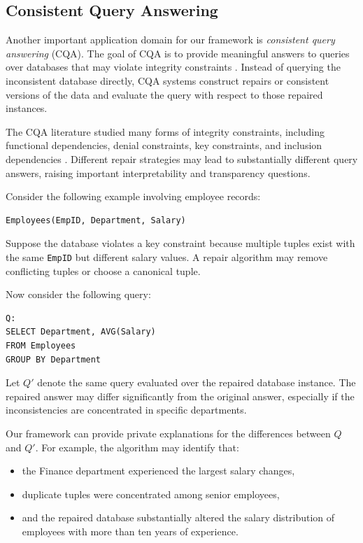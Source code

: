 \subsection{Consistent Query Answering}

Another important application domain for our framework is
\emph{consistent query answering} (CQA).
The goal of CQA is to provide meaningful answers to queries
over databases that may violate integrity constraints
\cite{bertossi2011,bertossi2006}.
Instead of querying the inconsistent database directly,
CQA systems construct repairs or consistent versions of the data
and evaluate the query with respect to those repaired instances.

The CQA literature studied many forms of integrity constraints,
including functional dependencies, denial constraints,
key constraints, and inclusion dependencies
\cite{bertossi2011,arenas1999}.
Different repair strategies may lead to substantially different query answers,
raising important interpretability and transparency questions.

Consider the following example involving employee records:

\begin{verbatim}
Employees(EmpID, Department, Salary)
\end{verbatim}

Suppose the database violates a key constraint because multiple tuples
exist with the same \texttt{EmpID} but different salary values.
A repair algorithm may remove conflicting tuples or choose a canonical tuple.

Now consider the following query:

\begin{verbatim}
Q:
SELECT Department, AVG(Salary)
FROM Employees
GROUP BY Department
\end{verbatim}

Let $Q'$ denote the same query evaluated over the repaired database instance.
The repaired answer may differ significantly from the original answer,
especially if the inconsistencies are concentrated in specific departments.

Our framework can provide private explanations for the differences
between $Q$ and $Q'$.
For example, the algorithm may identify that:
\begin{itemize}
    \item the Finance department experienced the largest salary changes,
    \item duplicate tuples were concentrated among senior employees,
    \item and the repaired database substantially altered the salary distribution
    of employees with more than ten years of experience.
\end{itemize}

